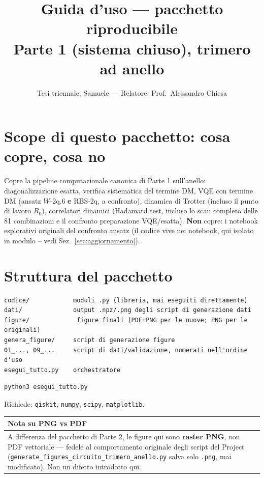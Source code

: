 \documentclass[11pt,a4paper]{article}
\title{Guida d'uso --- pacchetto riproducibile\\Parte 1 (sistema chiuso), trimero ad anello}
\author{Tesi triennale, Samuele --- Relatore: Prof.\ Alessandro Chiesa}
\date{}
\begin{document}
\sloppy
\maketitle

\tableofcontents

\section{Scope di questo pacchetto: cosa copre, cosa no}

Copre la pipeline computazionale canonica di Parte 1 sull'anello:
diagonalizzazione esatta, verifica sistematica del termine DM, VQE con
termine DM (ansatz $W$-2q.6 \textbf{e} RBS-2q, a confronto), dinamica di
Trotter (incluso il punto di lavoro $R_0$), correlatori dinamici
(Hadamard test, incluso lo scan completo delle 81 combinazioni e il
confronto preparazione VQE/esatta). \textbf{Non} copre: i notebook
esplorativi originali del confronto ansatz (il codice vive nei
notebook, qui isolato in modulo -- vedi Sez.~\ref{sec:aggiornamento}).

\section{Struttura del pacchetto}

\begin{verbatim}
codice/            moduli .py (libreria, mai eseguiti direttamente)
dati/              output .npz/.png degli script di generazione dati
figure/             figure finali (PDF+PNG per le nuove; PNG per le originali)
genera_figure/     script di generazione figure
01_..., 09_...     script di dati/validazione, numerati nell'ordine d'uso
esegui_tutto.py    orchestratore
\end{verbatim}

\begin{verbatim}
python3 esegui_tutto.py
\end{verbatim}
Richiede: \texttt{qiskit}, \texttt{numpy}, \texttt{scipy}, \texttt{matplotlib}.

\begin{center}
\renewcommand{\arraystretch}{1.2}
\begin{tabular}{@{}p{4cm}p{6cm}p{4cm}@{}}
\toprule
\textbf{Nota su PNG vs PDF} & \\
\midrule
\multicolumn{3}{p{14cm}}{A differenza del pacchetto di Parte 2, le figure
qui sono \textbf{raster PNG}, non PDF vettoriale --- fedele al
comportamento originale degli script del Project
(\texttt{generate\_figures\_circuito\_trimero\_anello.py} salva solo
\texttt{.png}, mai modificato). Non un difetto introdotto qui.}\\
\bottomrule
\end{tabular}
\end{center}
\end{document}
